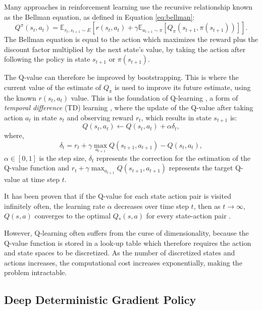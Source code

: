 \documentclass[conference]{IEEEtran}
\begin{document}
Many approaches in reinforcement learning use the recursive relationship known as the Bellman equation, as defined in Equation \ref{eq:bellman}:
\begin{dmath}
	\label{eq:bellman}
	Q^\pi(s_t,a_t)=\mathbb{E}_{{r_t},s_{t+1}\sim E} [r(s_t,a_t)+
	\gamma\mathbb{E}_{a_{t+1}\sim \pi}[Q_\pi(s_{t+1},\pi(s_{t+1}))]].
\end{dmath}
\noindent The Bellman equation is equal to the action which maximizes the reward plus the discount factor multiplied by the next state's value, by taking the action after following the policy in state $s_{t+1}$ or $\pi(s_{t+1})$.

The Q-value can therefore be improved by bootstrapping. This is where the current value of the estimate of $Q_\pi$ is used to improve its future estimate, using the known $r(s_t,a_t)$ value. This is the foundation of Q-learning \cite{Gay2007}, a form of \textit{temporal difference} (TD) learning \cite{Sutton2015}, where the update of the Q-value after taking action $a_t$ in state $s_t$ and observing reward $r_t$, which results in state $s_{t+1}$ is:
\begin{equation}
	Q(s_t,a_t)\leftarrow Q(s_t,a_t)+\alpha\delta_t,
\end{equation}
\noindent where,
\begin{equation}
	\delta_t=r_t+\gamma\max_{a_{t+1}}Q(s_{t+1},a_{t+1})-Q(s_{t},a_t),
\end{equation}
\noindent $\alpha\in [0,1]$ is the step size, $\delta_t$ represents the correction for the estimation of the Q-value function and $r_t+\gamma\max_{a_{t+1}}Q(s_{t+1},a_{t+1})$ represents the target Q-value at time step $t$.	


It has been proven that if the Q-value for each state action pair is visited infinitely often, the learning rate $\alpha$ decreases over time step $t$, then as $t\rightarrow \infty$, $Q(s,a)$ converges to the optimal $Q_*(s,a)$ for every state-action pair \cite{Gay2007}.

However, Q-learning often suffers from the curse of dimensionality, because the Q-value function is stored in a look-up table which therefore requires the action and state spaces to be discretized. As the number of discretized states and actions increases, the computational cost increases exponentially, making the problem intractable. 

\subsection{Deep Deterministic Gradient Policy}
\end{document}
